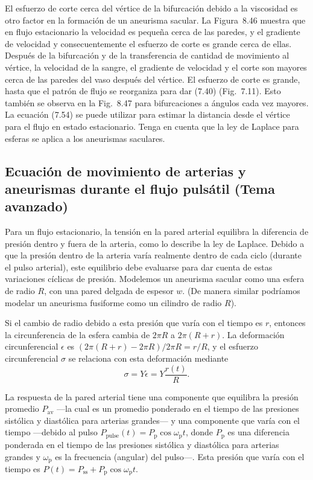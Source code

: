 \documentclass[12pt]{book}
\begin{document}
El esfuerzo de corte cerca del vértice de la bifurcación debido a la viscosidad es otro factor en la formación de un aneurisma sacular. La Figura~8.46 muestra que en flujo estacionario la velocidad es pequeña cerca de las paredes, y el gradiente de velocidad y consecuentemente el esfuerzo de corte es grande cerca de ellas. Después de la bifurcación y de la transferencia de cantidad de movimiento al vértice, la velocidad de la sangre, el gradiente de velocidad y el corte son mayores cerca de las paredes del vaso después del vértice. El esfuerzo de corte es grande, hasta que el patrón de flujo se reorganiza para dar (7.40) (Fig.~7.11). Esto también se observa en la Fig.~8.47 para bifurcaciones a ángulos cada vez mayores. La ecuación (7.54) se puede utilizar para estimar la distancia desde el vértice para el flujo en estado estacionario. Tenga en cuenta que la ley de Laplace para esferas se aplica a los aneurismas saculares.

\subsection{Ecuación de movimiento de arterias y aneurismas durante el flujo pulsátil (Tema avanzado)}

Para un flujo estacionario, la tensión en la pared arterial equilibra la diferencia de presión dentro y fuera de la arteria, como lo describe la ley de Laplace. Debido a que la presión dentro de la arteria varía realmente dentro de cada ciclo (durante el pulso arterial), este equilibrio debe evaluarse para dar cuenta de estas variaciones cíclicas de presión. Modelemos un aneurisma sacular como una esfera de radio $R$, con una pared delgada de espesor $w$. (De manera similar podríamos modelar un aneurisma fusiforme como un cilindro de radio $R$).

Si el cambio de radio debido a esta presión que varía con el tiempo es $r$, entonces la circunferencia de la esfera cambia de $2\pi R$ a $2\pi(R + r)$. La deformación circunferencial $\epsilon$ es $(2\pi(R + r) - 2\pi R)/2\pi R = r/R$, y el esfuerzo circunferencial $\sigma$ se relaciona con esta deformación mediante
\begin{equation}
\sigma = Y \epsilon = Y \frac{r(t)}{R}.
\label{eq:842}
\end{equation}

La respuesta de la pared arterial tiene una componente que equilibra la presión promedio $P_{\text{av}}$ ---la cual es un promedio ponderado en el tiempo de las presiones sistólica y diastólica para arterias grandes--- y una componente que varía con el tiempo ---debido al pulso $P_{\text{pulse}}(t) = P_{\text{p}} \cos\omega_{\text{p}} t$, donde $P_{\text{p}}$ es una diferencia ponderada en el tiempo de las presiones sistólica y diastólica para arterias grandes y $\omega_{\text{p}}$ es la frecuencia (angular) del pulso---. Esta presión que varía con el tiempo es $P(t) = P_{\text{ss}} + P_{\text{p}} \cos\omega_{\text{p}} t$.
\end{document}
